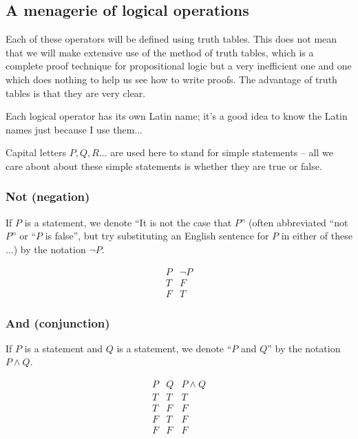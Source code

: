 \documentclass[12pt]{article}
\begin{document}
\subsection{A menagerie of logical operations}

Each of these operators will be defined using truth tables.  This does
not mean that we will make extensive use of the method of truth
tables, which is a complete proof technique for propositional logic
but a very inefficient one and one which does nothing to help us see
how to write proofs.  The advantage of truth tables is that they are
very clear.

Each logical operator has its own Latin name; it's a good idea to know the Latin names just because I use them...

Capital letters $P,Q,R\ldots$ are used here to stand for simple
statements -- all we care about about these simple statements is
whether they are true or false.

\subsubsection{Not (negation)}

If $P$ is a  statement, we denote ``It is not the case that $P$''
(often abbreviated ``not $P$'' or ``$P$ is false'', but try substituting an English sentence for $P$ in either of these$\ldots$) by the notation $\neg P$.

$$\begin{array}{c|c} P & \neg P \\ \hline T & F \\ F & T \end{array}$$

\subsubsection{And (conjunction)}

If $P$ is a statement and $Q$ is a statement, we denote ``$P$ and
$Q$'' by the notation $P \wedge Q$.  

$$\begin{array}{c|c|c} P  & Q & P \wedge Q \\ \hline
                       T  & T &   T  \\
                       T  & F &   F  \\
                       F  & T &   F  \\
                       F  & F &   F \end{array}$$
\end{document}
